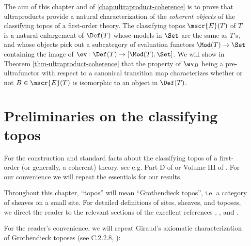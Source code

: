 \label{chap-classifying-toposes}
The aim of this chapter and of \autoref{chap:ultraproduct-coherence} is to prove that ultraproducts provide a natural characterization of the \emph{coherent objects} of the classifying topos of a first-order theory. The classifying topos $\mscr{E}(T)$ of $T$ is a natural enlargement of $\Def(T)$ whose models in $\Set$ are the same as $T$'s, and whose objects pick out a subcategory of evaluation functors $\Mod(T) \to \Set$ containing the image of $\ev : \Def(T) \to [\Mod(T), \Set]$. We will show in Theorem \ref{thm-ultraproduct-coherence} that the property of $\ev_B$ being a pre-ultrafunctor with respect to a canonical transition map characterizes whether or not $B \in \mscr{E}(T)$ is isomorphic to an object in $\Def(T)$.

\section{Preliminaries on the classifying topos}
For the construction and standard facts about the classifying topos of a first-order (or generally, a coherent) theory, see e.g. Part D of \cite{johnstone-elephant} or Volume III of \cite{borceux-handbook}. For our convenience we will repeat the essentials for our results.

Throughout this chapter, ``topos'' will mean ``Grothendieck topos'', i.e. a category of sheaves on a small site. For detailed definitions of sites, sheaves, and toposes, we direct the reader to the relevant sections of the excellent references \cite{maclane-moerdijk}, \cite{borceux-handbook}, and \cite{johnstone-elephant}.

For the reader's convenience, we will repeat Giraud's axiomatic characterization of Grothendieck toposes (see C.2.2.8, \cite{johnstone-elephant}):


